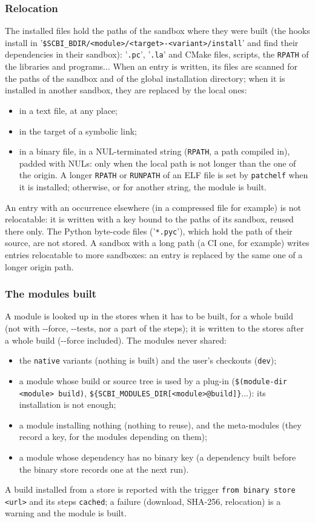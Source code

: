 \documentclass[a4paper,12pt,twoside]{article}
\newcommand{\code}[1]{\texttt{#1}}
\newcommand{\file}[1]{'{\texttt{#1}}'}
\newcommand{\ddash}{-{}-}
\begin{document}
\subsubsection{Relocation}

The installed files hold the paths of the sandbox where they were built (the hooks install in \file{\$SCBI\_BDIR/<module>/<target>-<variant>/install} and find their dependencies in their sandbox): \file{.pc}, \file{.la} and CMake files, scripts, the \code{RPATH} of the libraries and programs... When an entry is written, its files are scanned for the paths of the sandbox and of the global installation directory; when it is installed in another sandbox, they are replaced by the local ones:
\begin{itemize}
	\item in a text file, at any place;
	\item in the target of a symbolic link;
	\item in a binary file, in a NUL-terminated string (\code{RPATH}, a path compiled in), padded with NULs: only when the local path is not longer than the one of the origin. A longer \code{RPATH} or \code{RUNPATH} of an ELF file is set by \code{patchelf} when it is installed; otherwise, or for another string, the module is built.
\end{itemize}
An entry with an occurrence elsewhere (in a compressed file for example) is not relocatable: it is written with a key bound to the paths of its sandbox, reused there only. The Python byte-code files (\file{*.pyc}), which hold the path of their source, are not stored. A sandbox with a long path (a CI one, for example) writes entries relocatable to more sandboxes: an entry is replaced by the same one of a longer origin path.

\subsubsection{The modules built}

A module is looked up in the stores when it has to be built, for a whole build (not with \ddash{}force, \ddash{}tests, nor a part of the steps); it is written to the stores after a whole build (\ddash{}force included). The modules never shared:
\begin{itemize}
	\item the \code{native} variants (nothing is built) and the user's checkouts (\code{dev});
	\item a module whose build or source tree is used by a plug-in (\code{\$(module-dir <module> build)}, \code{\$\{SCBI\_MODULES\_DIR[<module>@build]\}}...): its installation is not enough;
	\item a module installing nothing (nothing to reuse), and the meta-modules (they record a key, for the modules depending on them);
	\item a module whose dependency has no binary key (a dependency built before the binary store records one at the next run).
\end{itemize}
A build installed from a store is reported with the trigger \code{from binary store <url>} and its steps \code{cached}; a failure (download, SHA-256, relocation) is a warning and the module is built.
\end{document}
